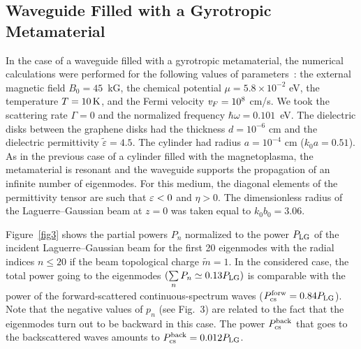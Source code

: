 \documentclass[conference,a4paper]{IEEEtran}
\begin{document}
\subsection{Waveguide Filled with a Gyrotropic Metamaterial}
In the case of a waveguide filled with a gyrotropic metamaterial, the numerical calculations were performed for the following values of parameters~\cite{Gusynin2007}: the external magnetic field $B_0=45$~kG, the chemical potential $\mu = 5{.}8\times 10^{-2}$ eV, the temperature $T=10\,{\rm K}$, and the Fermi velocity ${\it v}_F=10^8$ cm/s. We took the scattering rate $\Gamma=0$ and the normalized frequency $\hbar \omega = 0.101$~eV. The dielectric disks between the graphene disks had the thickness $d=10^{-6}$ cm and the dielectric permittivity $\tilde{\varepsilon}=4.5$. The cylinder had radius $a=10^{-4}$ cm ($k_0 a= 0.51$). As in the previous case of a cylinder filled with the magnetoplasma, the metamaterial is resonant and the waveguide supports the propagation of an infinite number of eigenmodes. For this medium, the diagonal elements of the permittivity tensor are such that $\varepsilon<0$ and $\eta>0$. The dimensionless radius of the Laguerre--Gaussian beam at $z=0$ was taken equal to $k_0 b_0 = 3.06$.





Figure~\ref{fig3} shows the partial powers $P_n$ normalized to the power $P_{\rm LG}$ of the incident Laguerre--Gaussian beam for the first 20 eigenmodes with the radial indices $n\leq 20$ if the beam topological charge $\tilde{m}=1$. In the considered case, the total power going to the eigenmodes $(\sum\limits_{n}P_n\simeq 0{.}13 P_{\rm LG})$ is comparable with the power of the forward-scattered continuous-spectrum waves ($P_{\rm cs}^{\rm forw} = 0{.}84 P_{\rm LG}$). Note that the negative values of $p_n$ (see Fig.~3) are related to the fact that the eigenmodes turn out to be backward in this case.
The power $P_{\rm cs}^{\rm back}$ that goes to the backscattered waves amounts to $P_{\rm cs}^{\rm back} = 0{.}012 P_{\rm LG}$.


{\enlargethispage{-3.1in}}

\end{document}
